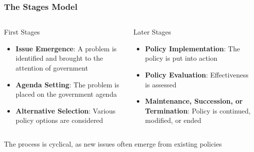 \documentclass[10pt]{beamer}
\begin{document}
\begin{frame}
\frametitle{The Stages Model}

\begin{columns}
\begin{column}{0.48\textwidth}
\begin{block}{First Stages}
\pause
\begin{itemize}
\item \textbf{Issue Emergence}: A problem is identified and brought to the attention of government
\item \textbf{Agenda Setting}: The problem is placed on the government agenda
\item \textbf{Alternative Selection}: Various policy options are considered
\end{itemize}
\end{block}
\end{column}

\begin{column}{0.48\textwidth}
\begin{block}{Later Stages}
\pause
\begin{itemize}
\item \textbf{Policy Implementation}: The policy is put into action
\item \textbf{Policy Evaluation}: Effectiveness is assessed
\item \textbf{Maintenance, Succession, or Termination}: Policy is continued, modified, or ended
\end{itemize}
\end{block}
\end{column}
\end{columns}

\pause
\vspace{0.5cm}
\centering
The process is cyclical, as new issues often emerge from existing policies

\end{frame}
\end{document}
